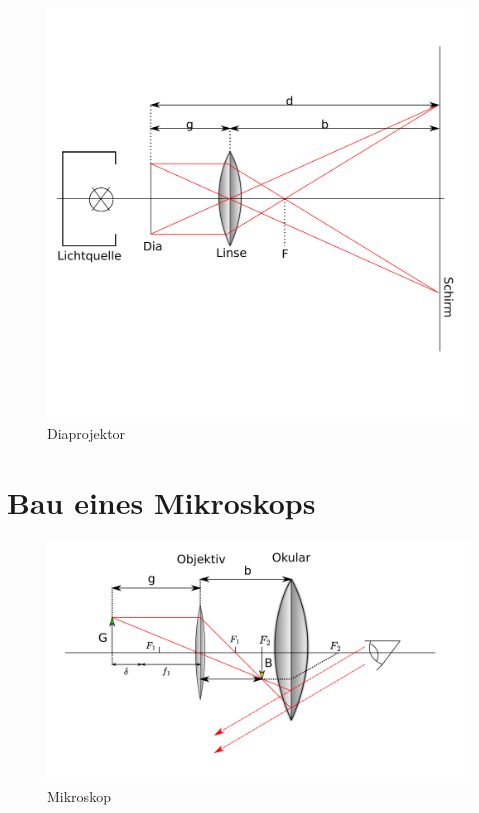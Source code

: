 \begin{figure}
    \centering
    \includegraphics[scale=0.8]{Geometrische_Optik/Protokoll/fig/Diaprojektor.png}
    \caption{Diaprojektor}
    \label{fig:Diaprojektor}
\end{figure}

\section{Bau eines Mikroskops}

\begin{figure}
    \centering
    \includegraphics[scale=0.8]{Geometrische_Optik/Protokoll/fig/Mikroskop.png}
    \caption{Mikroskop}
    \label{fig:Mikroskop}
\end{figure}
